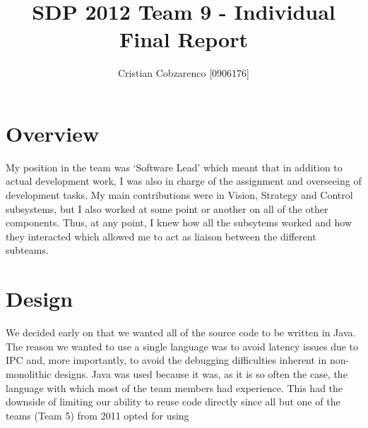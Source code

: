 \documentclass[a4paper,12pt]{article}
\title{SDP 2012 Team 9 - Individual Final Report}
\author{Cristian Cobzarenco [0906176]}
\begin{document}
\maketitle

\section{Overview}
My position in the team was `Software Lead' which meant that in addition to actual development work, I was also in charge of the assignment and overseeing of development tasks. My main contributions were in Vision, Strategy and Control subsystems, but I also worked at some point or another on all of the other components. Thus, at any point, I knew how all the subsytems worked and how they interacted which allowed me to act as liaison between the different subteams.

\section{Design}
We decided early on that we wanted all of the source code to be written in Java. The reason we wanted to use a single language was to avoid latency issues due to IPC and, more importantly, to avoid the debugging difficulties inherent in non-monolithic designs. Java was used because it was, as it is so often the case, the language with which most of the team members had experience. This had the downside of limiting our ability to reuse code directly since all but one of the teams (Team 5) from 2011 opted for using 
\end{document}

